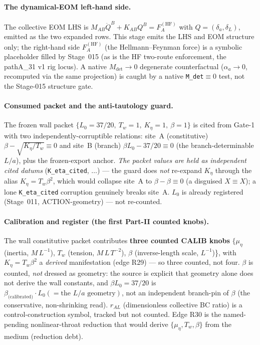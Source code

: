 \paragraph{The dynamical-EOM left-hand side.}
The collective EOM LHS is \(M_{AB}\ddot Q^B+K_{AB}Q^B=F_A^{(\mathrm{HF})}\) with
\(Q=(\delta_a,\delta_L)\), emitted as the two expanded rows. This stage emits the
LHS and EOM structure only; the right-hand side \(F_A^{(\mathrm{HF})}\) (the
Hellmann--Feynman force) is a symbolic placeholder filled by Stage~015 (as is the
HF two-route enforcement, the pathA\_31 v1 rig locus). A native
\(M_{\det}\to0\) degenerate counterfactual (\(\alpha_a\to0\), recomputed via the
same projection) is caught by a native \texttt{M\_det}\(\equiv0\) test, not the
Stage-015 structure gate.

\paragraph{Consumed packet and the anti-tautology guard.}
The frozen wall packet \(\{L_0=37/20,\ T_w=1,\ K_\eta=1,\ \beta=1\}\) is cited
from Gate-1 with two independently-corruptible relations: site~A (constitutive)
\(\beta-\sqrt{K_\eta/T_w}\equiv0\) and site~B (branch)
\(\beta L_0-37/20\equiv0\) (the branch-determinable \(L/a\)), plus the
frozen-export anchor. \emph{The packet values are held as independent cited
datums} (\texttt{K\_eta\_cited}, \(\ldots\)) --- the guard does \emph{not}
re-expand \(K_\eta\) through the alias \(K_\eta=T_w\beta^2\), which would collapse
site~A to \(\beta-\beta\equiv0\) (a disguised \(X\equiv X\)); a lone
\texttt{K\_eta\_cited} corruption genuinely breaks site~A. \(L_0\) is already
registered (Stage~011, ACTION-geometry) --- not re-counted.

\paragraph{Calibration and register (the first Part-II counted knobs).}
The wall constitutive packet contributes \textbf{three counted CALIB knobs}
\(\{\mu_\eta\) (inertia, \(M\,L^{-1}\)), \(T_w\) (tension, \(M\,L\,T^{-2}\)),
\(\beta\) (inverse-length scale, \(L^{-1}\))\}, with \(K_\eta=T_w\beta^2\) a
\emph{derived} manifestation (edge R29) --- so three counted, not four.
\(\beta\) is counted, \emph{not} dressed as geometry: the source is explicit that
geometry alone does not derive the wall constants, and \(\beta L_0=37/20\) is
\(\beta_{\text{(calibrated)}}\cdot L_0(=\text{the }L/a\text{ geometry})\), not an
independent branch-pin of \(\beta\) (the conservative, non-shrinking read).
\(r_{AL}\) (dimensionless collective BC ratio) is a control-construction symbol,
tracked but not counted. Edge R30 is the named-pending nonlinear-throat reduction
that would derive \(\{\mu_\eta,T_w,\beta\}\) from the medium (reduction debt).

